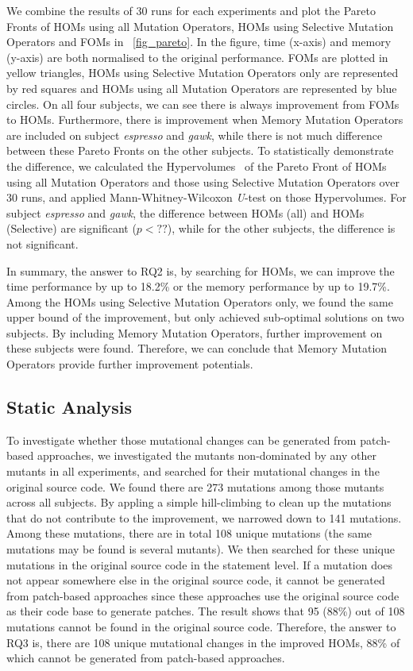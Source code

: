 \documentclass[oribibl]{llncs}
\begin{document}
We combine the results of 30 runs for each experiments and plot the Pareto Fronts of HOMs using all Mutation Operators, HOMs using Selective Mutation Operators and FOMs in \figurename~\ref{fig_pareto}.
In the figure, time (x-axis) and memory (y-axis) are both normalised to the original performance.
FOMs are plotted in yellow triangles, HOMs using Selective Mutation Operators only are represented by red squares and HOMs using all Mutation Operators are represented by blue circles.
On all four subjects, we can see there is always improvement from FOMs to HOMs. 
Furthermore, there is improvement when Memory Mutation Operators are included on subject \emph{espresso} and \emph{gawk}, while there is not much difference between these Pareto Fronts on the other subjects.
To statistically demonstrate the difference, we calculated the Hypervolumes~\cite{797969} of the Pareto Front of HOMs using all Mutation Operators and those using Selective Mutation Operators over 30 runs, and applied Mann-Whitney-Wilcoxon \emph{U}-test on those Hypervolumes.
For subject \emph{espresso} and \emph{gawk}, the difference between HOMs (all) and HOMs (Selective) are significant ($p<??$), while for the other subjects, the difference is not significant.

In summary, the answer to RQ2 is, by searching for HOMs, we can improve the time performance by up to 18.2\% or the memory performance by up to 19.7\%. 
Among the HOMs using Selective Mutation Operators only, we found the same upper bound of the improvement, but only achieved sub-optimal solutions on two subjects.
By including Memory Mutation Operators, further improvement on these subjects were found.
Therefore, we can conclude that Memory Mutation Operators provide further improvement potentials.

\subsection{Static Analysis}
\label{sec_resstatic}

To investigate whether those mutational changes can be generated from patch-based approaches, we investigated the mutants non-dominated by any other mutants in all experiments, and searched for their mutational changes in the original source code.
We found there are 273 mutations among those mutants across all subjects.
By appling a simple hill-climbing to clean up the mutations that do not contribute to the improvement, we narrowed down to 141 mutations.
Among these mutations, there are in total 108 unique mutations (the same mutations may be found is several mutants).
We then searched for these unique mutations in the original source code in the statement level.
If a mutation does not appear somewhere else in the original source code, it cannot be generated from patch-based approaches since these approaches use the original source code as their code base to generate patches.
The result shows that 95 (88\%) out of 108 mutations cannot be found in the original source code.
Therefore, the answer to RQ3 is, there are 108 unique mutational changes in the improved HOMs, 88\% of which cannot be generated from patch-based approaches.
\end{document}
